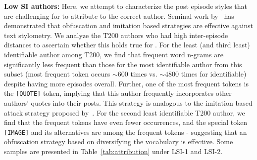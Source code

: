 \noindent \textbf{Low SI authors:}  Here, we attempt to characterize the post episode styles that are challenging for \SYSMLmethodname{} to attribute to the correct author.
Seminal work by~\citet{brennan2009practical, brennan2012adversarial} has demonstrated that obfuscation and imitation based strategies are effective against text stylometry.
We analyze the T200 authors who had high inter-episode distances to ascertain whether this holds true for \SYSMLmethodname{}.
For the least (and third least) identifiable author among T200, we find that frequent word n-grams are significantly less frequent than those for the most identifiable author from this subset (most frequent token occurs $\sim 600$ times vs. $\sim 4800$ times for identifiable) despite having more episodes overall. 
Further, one of the most frequent tokens is the \texttt{{[QUOTE]}} token, implying that this author frequently incorporates other authors' quotes into their posts.  
This strategy is analogous to the imitation based attack strategy proposed by~\citet{brennan2012adversarial}.
For the second least identifiable T200 author, we find that the frequent tokens have even fewer occurrences, and the special token \texttt{{[IMAGE]}} and its alternatives are among the frequent tokens - suggesting that an obfuscation strategy based on diversifying the vocabulary is effective.
Some samples are presented in Table~\ref{tab:attribution} under LSI-1 and LSI-2.

